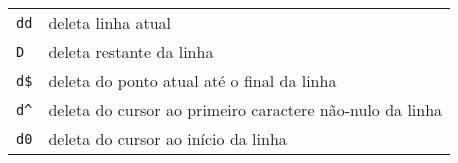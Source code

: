%
%
%
\begin{table}[htb]
\begin{center}
\begin{tabular}{ll}
\hline
\verb|dd| & deleta linha atual \\
\verb|D|  & deleta restante da linha \\
\verb|d$| & deleta do ponto atual até o final da linha \\
\verb|d^| & deleta do cursor ao primeiro caractere não-nulo da linha \\ 
\verb|d0| & deleta do cursor ao início da linha \\ \hline
\end{tabular}
\end{center}
\end{table} 

